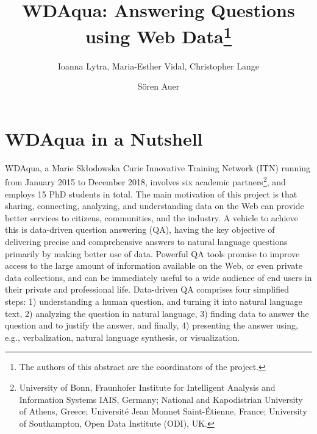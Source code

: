\documentclass[a4paper]{llncs}
\begin{document}
	
	\mainmatter
	\title{WDAqua: Answering Questions using Web Data\thanks{The authors of this abstract are the coordinators of the project.}}
	
	\author{Ioanna Lytra, Maria-Esther Vidal, Christopher Lange \and S{\"o}ren Auer}
	
	\maketitle
	
	\section{WDAqua in a Nutshell} \label{sec:intro}
	WDAqua, a Marie Sk{\l}odowska Curie Innovative Training Network (ITN) running from January 2015 to December 2018, involves six academic partners\footnote{University of Bonn, Fraunhofer Institute for Intelligent Analysis and Information Systems IAIS, Germany; National and Kapodistrian University of Athens, Greece; Universit{\'e} Jean Monnet Saint-{\'E}tienne, France; University of Southampton, Open Data Institute (ODI), UK.}, and employs 15 PhD students in total.
        The main motivation of this project is that sharing, connecting, analyzing, and understanding data on the Web can provide better services to citizens, communities, and the industry.
        A vehicle to achieve this is data-driven question answering (QA), having the key objective of delivering precise and comprehensive answers to natural language questions primarily by making better use of data.
        Powerful QA tools promise to improve access to the large amount of information available on the Web, or even private data collections, and can be immediately useful to a wide audience of end users in their private and professional life.
        Data-driven QA comprises four simplified steps: 1) understanding a human question, and turning it into natural language text, 2) analyzing the question in natural language, 3) finding data to answer the question and to justify the answer, and finally, 4) presenting the answer using, e.g., verbalization, natural language synthesis, or visualization.
	
\end{document}
